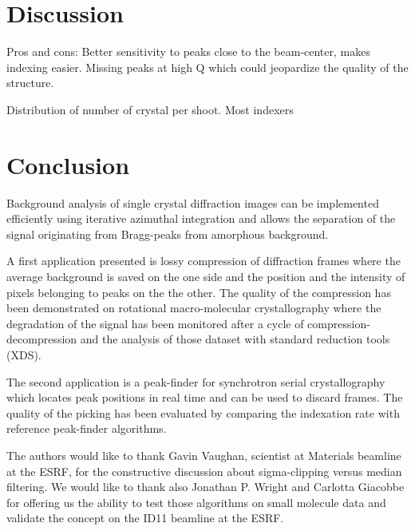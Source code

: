 \documentclass[preprint]{iucr}              %
\begin{document}
\section{Discussion}
Pros and cons: 
Better sensitivity to peaks close to the beam-center, makes indexing easier.
Missing peaks at high Q which could jeopardize the quality of the structure.




Distribution of number of crystal per shoot. 
Most indexers  


\section{Conclusion}

Background analysis of single crystal diffraction images can be implemented efficiently using iterative azimuthal integration and allows the separation of the signal originating from Bragg-peaks from amorphous background.

A first application presented is lossy compression of diffraction frames where the average background is saved on the one side and the position and the intensity of pixels belonging to peaks on the the other.
The quality of the compression has been demonstrated on rotational macro-molecular crystallography where the degradation of the signal has been monitored after a cycle of compression-decompression and the analysis of those dataset with standard reduction tools (XDS).

The second application is a peak-finder for synchrotron serial crystallography which locates peak positions in real time and can be used to discard frames. 
The quality of the picking has been evaluated by comparing the indexation rate with reference peak-finder algorithms.



The authors would like to thank Gavin Vaughan, scientist at Materials beamline at the ESRF,  for the constructive discussion about sigma-clipping versus median filtering. 
We would like to thank also Jonathan P. Wright and Carlotta Giacobbe for offering us the ability to test those algorithms on small molecule data and validate the concept on the ID11 beamline at the ESRF.




\end{document}

